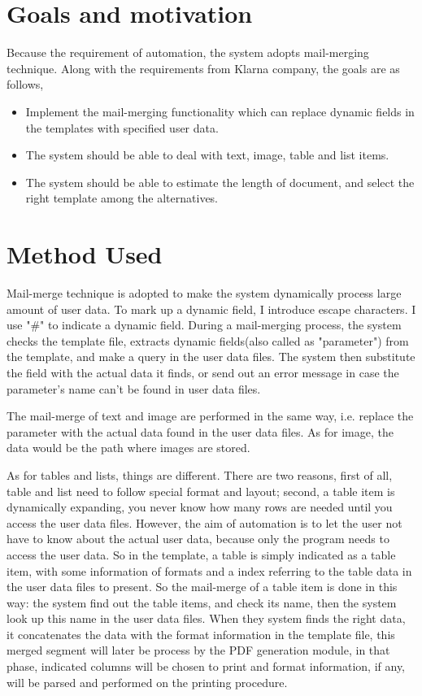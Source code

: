\documentclass[12pt,twoside,a4paper]{report}
\begin{document}
\section{Goals and motivation}

  Because the requirement of automation, the system adopts mail-merging technique. Along with the requirements from Klarna company, the goals are as follows,

\begin{itemize}
\item Implement the mail-merging functionality which can replace dynamic fields in the templates with specified user data.
\item The system should be able to deal with text, image, table and list items.
\item The system should be able to estimate the length of document, and select the right template among the alternatives.
\end{itemize}

\section{Method Used}
  Mail-merge technique is adopted to make the system dynamically process large amount of user data. To mark up a dynamic field, I introduce escape characters. I use "\#" to indicate a dynamic field. During a mail-merging process, the system checks the template file, extracts dynamic fields(also called as "parameter") from the template, and make a query in the user data files. The system then substitute the field with the actual data it finds, or send out an error message in case the parameter's name can't be found in user data files. 

  The mail-merge of text and image are performed in the same way, i.e. replace the parameter with the actual data found in the user data files. As for image, the data would be the path where images are stored.

  As for tables and lists, things are different. There are two reasons, first of all, table and list need to follow special format and layout; second, a table item is dynamically expanding, you never know how many rows are needed until you access the user data files. However, the aim of automation is to let the user not have to know about the actual user data, because only the program needs to access the user data. So in the template, a table is simply indicated as a table item, with some information of formats and a index referring to the table data in the user data files to present. So the mail-merge of a table item is done in this way: the system find out the table items, and check its name, then the system look up this name in the user data files. When they system finds the right data, it concatenates the data with the format information in the template file, this merged segment will later be process by the PDF generation module, in that phase, indicated columns will be chosen to print and format information, if any, will be parsed and performed on the printing procedure.
\end{document}
